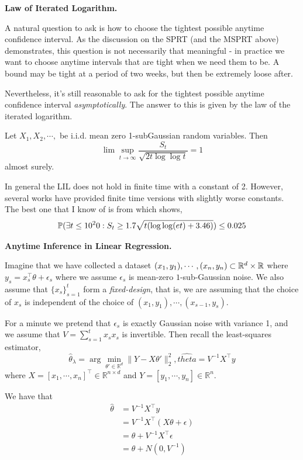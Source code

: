 \noindent\textbf{Law of Iterated Logarithm.}

A natural question to ask is how to choose the tightest possible anytime confidence interval. As the discussion on the SPRT (and the MSPRT above) demonstrates, this question is not necessarily that meaningful - in practice we want to choose anytime intervals that are tight when we need them to be. A bound may be tight at a period of two weeks, but then be extremely loose after.  

Nevertheless, it's still reasonable to ask for the tightest possible anytime confidence interval \textit{asymptotically}. The answer to this is given by the law of the iterated logarithm.

\begin{theorem}
    Let $X_1, X_2, \cdots, $ be i.i.d. mean zero 1-subGaussian random variables. Then \[\lim\sup_{t\rightarrow \infty} \frac{S_t}{\sqrt{2t\log\log t}} = 1\] almost surely.
\end{theorem}

In general the LIL does not hold in finite time with a constant of 2. However, several works have provided finite time versions with slightly worse constants. The best one that I know of is from \cite{howard2021time} which shows,
\[\P(\exists t\leq 10^20: S_t\geq 1.7\sqrt{t(\log\log(e t) + 3.46)})\leq 0.025\]


\noindent \textbf{Anytime Inference in Linear Regression.} 

Imagine that we have collected a dataset $(x_1, y_1), \cdots, (x_n, y_n) \subset \mathbb{R}^d \times \mb{R}$ where $y_s = x_s^{\top}\theta + \epsilon_s$ where we assume $\epsilon_s$ is mean-zero $1$-sub-Gaussian noise. We also assume that $\{x_s\}_{s=1}^t$ form a \textit{fixed-design}, that is, we are assuming that the choice of $x_s$ is independent of the choice of $(x_1, y_1), \cdots, (x_{s-1}, y_s)$. 

For a minute we pretend that $\epsilon_s$ is exactly Gaussian noise with variance 1, and we assume that $V = \sum_{s=1}^t x_s x_s$ is invertible. Then recall the least-squares estimator,
\[\hat\theta_{\lambda} = \arg\min_{\theta' \in \mathbb{R}^d} \|Y - X\theta'\|^2_2, \hat{theta} = V^{-1} X^{\top} y\]
where $X = [x_1, \cdots, x_n]^{\top} \in \mathbb{R}^{n\times d}$ and $Y = [y_1, \cdots, y_n]\in\mathbb{R}^n$. 

We have that 
\begin{align*}
    \hat{\theta}
    &= V^{-1} X^{\top} y\\
    &= V^{-1} X^{\top} ( X\theta + \epsilon)\\
    &= \theta + V^{-1} X^{\top}\epsilon\\
    &= \theta + N(0, V^{-1})
\end{align*}


